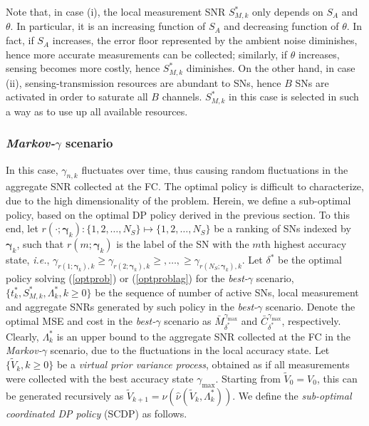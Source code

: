 \documentclass[10pt,twocolumn,twoside]{IEEEtran}
\theoremstyle{plain}
\begin{document}
 Note that, in case (i), the local measurement SNR $S_{M,k}^*$ only depends on $S_A$ and $\theta$.
 In particular, it is an increasing function of $S_A$ and decreasing function of $\theta$.
 In fact, if $S_A$ increases, the error floor represented by the ambient noise diminishes, hence
 more accurate measurements can be collected; similarly, if $\theta$ increases, sensing becomes more costly, hence
 $S_{M,k}^*$ diminishes.
 On the other hand, in case (ii), sensing-transmission resources are abundant to SNs, hence $B$ SNs are activated in order to saturate all $B$ channels.
 $S_{M,k}^*$ in this case is selected in such a way as to use up all available resources.

 

 \subsubsection{\emph{Markov-}$\gamma$ scenario}
 \label{MarkovCOORD}
 In this case, $\gamma_{n,k}$ fluctuates over time, thus causing random fluctuations
in the aggregate SNR collected at the FC.
 The optimal policy is difficult to characterize,
 due to the high dimensionality of the problem.
 Herein, we define a sub-optimal policy, based 
 on the optimal DP policy derived in the previous section.
 To this end, 
 let $r(\cdot;\boldsymbol{\gamma}_k):\{1,2,\dots,N_S\}\mapsto\{1,2,\dots,N_S\}$
be a ranking of SNs indexed by $\boldsymbol{\gamma}_k$, such that $r(m;\boldsymbol{\gamma}_k)$
is the label of the SN with the $m$th highest accuracy state,
\emph{i.e.}, $\gamma_{r(1;\boldsymbol{\gamma}_k),k}\geq\gamma_{r(2;\boldsymbol{\gamma}_k),k}\geq,\dots,\geq\gamma_{r(N_S;\boldsymbol{\gamma}_k),k}$. 
Let $\delta^*$ be the optimal policy solving
(\ref{optprob}) or (\ref{optproblag}) for the \emph{best-}$\gamma$ scenario,
 $\{t_k^*,S_{M,k}^*,\Lambda_k^*,k\geq 0\}$ be the sequence of number of active SNs, local measurement and aggregate SNRs generated by such policy
in the \emph{best-}$\gamma$ scenario.
Denote the optimal MSE and cost in the \emph{best-}$\gamma$ scenario as
$\bar M_{\delta^*}^{\gamma_{\max}}$ and $\bar C_{\delta^*}^{\gamma_{\max}}$, respectively.
Clearly, $\Lambda_k^*$ is an upper bound to the aggregate SNR collected at the FC in the 
\emph{Markov-}$\gamma$ scenario, due to the fluctuations in the local accuracy state.
 Let $\{\tilde V_k,k{\geq}0\}$ be a \emph{virtual prior variance process}, obtained as if all measurements were collected with
 the best accuracy state $\gamma_{\max}$. Starting from $\tilde V_0=V_0$, this can be generated recursively as $\tilde V_{k+1}=\nu(\hat\nu(\tilde V_k,\Lambda_k^*))$.
We define the \emph{sub-optimal coordinated DP policy} (SCDP) as follows.
\end{document}
